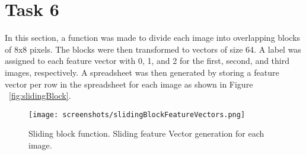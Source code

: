 \documentclass[sigconf]{acmart}
\begin{document}
\section{Task 6}
In this section, a function was made to divide each image into overlapping blocks of 8x8 pixels. The blocks were then transformed to vectors of size 64. A label was assigned to each feature vector with 0, 1, and 2 for the first, second, and third images, respectively. A spreadsheet was then generated by storing a feature vector per row in the spreadsheet for each image as shown in Figure ~\ref{fig:slidingBlock}.
\begin{figure}[h]
  \centering
  \texttt{[image: screenshots/slidingBlockFeatureVectors.png]}
  \caption{Sliding block function. Sliding feature Vector generation for each image.}
  \label{slidingBlock}
\end{figure}
\end{document}
